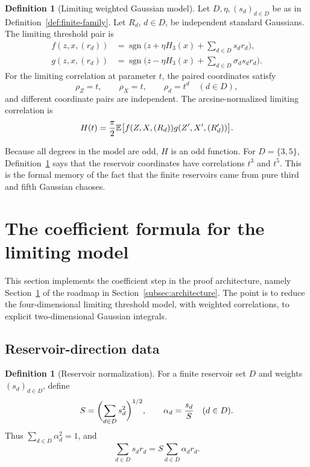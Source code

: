 \documentclass[11pt]{article}
\newcommand{\E}{\mathbb E}
\newcommand{\1}{\mathbf 1}
\newcommand{\sgn}{\operatorname{sgn}}
\theoremstyle{plain}
\theoremstyle{definition}
\newtheorem{definition}[theorem]{Definition}
\theoremstyle{remark}
\begin{document}
\begin{definition}[Limiting weighted Gaussian model]\label{def:limiting-model}
Let $D,\eta,(s_d)_{d\in D}$ be as in Definition~\ref{def:finite-family}.  Let $R_d$, $d\in D$, be independent standard Gaussians.  The limiting threshold pair is
\begin{align}
  f(z,x,(r_d))&=\sgn\biggl(z+\eta H_3(x)+\sum_{d\in D}s_dr_d\biggr),\label{eq:lim-f-general}\\
  g(z,x,(r_d))&=\sgn\biggl(z-\eta H_3(x)+\sum_{d\in D}\sigma_d s_dr_d\biggr).\label{eq:lim-g-general}
\end{align}
For the limiting correlation at parameter $t$, the paired coordinates satisfy
\[
  \rho_Z=t,
  \qquad \rho_X=t,
  \qquad \rho_d=t^d\quad(d\in D),
\]
and different coordinate pairs are independent.  The arcsine-normalized limiting correlation is
\begin{equation}\label{eq:lim-H}
  H(t)={\pi\over2}\E\bigl[f(Z,X,(R_d))g(Z',X',(R_d'))\bigr].
\end{equation}
\end{definition}

Because all degrees in the model are odd, $H$ is an odd function.  For $D=\{3,5\}$, Definition~\ref{def:limiting-model} says that the reservoir coordinates have correlations $t^3$ and $t^5$.  This is the formal memory of the fact that the finite reservoirs came from pure third and fifth Gaussian chaoses.


\section{The coefficient formula for the limiting model}\label{sec:coefficients}

This section implements the coefficient step in the proof architecture, namely Section~\ref{sec:coefficients} of the roadmap in Section~\ref{subsec:architecture}.  The point is to reduce the four-dimensional limiting threshold model, with weighted correlations, to explicit two-dimensional Gaussian integrals.

\subsection{Reservoir-direction data}\label{subsec:reservoir-data}

\begin{definition}[Reservoir normalization]\label{def:reservoir-normalization}
For a finite reservoir set $D$ and weights $(s_d)_{d\in D}$, define
\[
  S=\biggl(\sum_{d\in D}s_d^2\biggr)^{1/2},
  \qquad
  \alpha_d={s_d\over S}\quad(d\in D).
\]
Thus $\sum_{d\in D}\alpha_d^2=1$, and
\[
  \sum_{d\in D}s_dr_d=S\sum_{d\in D}\alpha_dr_d.
\]
\end{definition}
\end{document}
